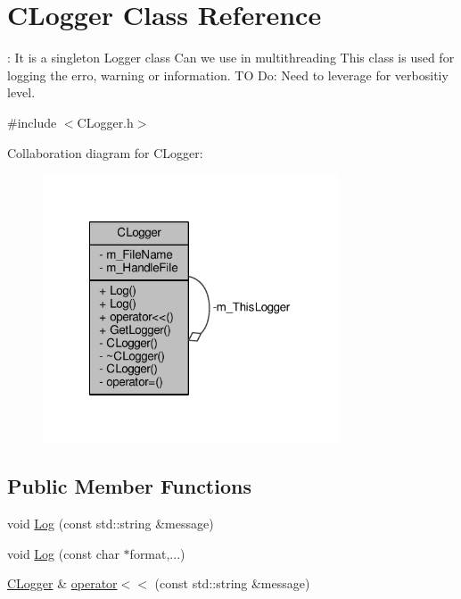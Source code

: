 \hypertarget{classCLogger}{\section{C\-Logger Class Reference}
\label{classCLogger}
}


\-: It is a singleton Logger class Can we use in multithreading This class is used for logging the erro, warning or information. T\-O Do\-: Need to leverage for verbositiy level.  




{\ttfamily \#include $<$C\-Logger.\-h$>$}



Collaboration diagram for C\-Logger\-:
\nopagebreak
\begin{figure}[H]
\begin{center}
\leavevmode
\includegraphics[width=248pt]{d9/dc8/classCLogger__coll__graph}
\end{center}
\end{figure}
\subsection*{Public Member Functions}
\begin{DoxyCompactItemize}
\item 
void \hyperlink{classCLogger_a7f66da116762cb9881af0591eda3e31b}{Log} (const std\-::string \&message)
\item 
void \hyperlink{classCLogger_a9d73d89d06a71ceb1ede9e97da2ebc4d}{Log} (const char $\ast$format,...)
\item 
\hyperlink{classCLogger}{C\-Logger} \& \hyperlink{classCLogger_a4ff21ad853c1aa9ffb5f80291b1977e3}{operator$<$$<$} (const std\-::string \&message)
\end{DoxyCompactItemize}
